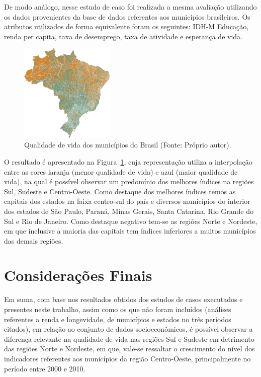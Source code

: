 \documentclass[conference]{IEEEtran}
\begin{document}
De modo análogo, nesse estudo de caso foi realizada a mesma avaliação utilizando os dados provenientes da base de dados referentes aos municípios brasileiros. Os atributos utilizados de forma equivalente foram os seguintes: IDH-M Educação, renda per capita, taxa de desemprego, taxa de atividade e esperança de vida. 

\begin{figure}[!ht]
\centering
\includegraphics[width=0.40\textwidth]{qualidade-de-vida.png}
\caption{Qualidade de vida dos municípios do Brasil (Fonte: Próprio autor).}
\label{img:qualidade-de-vida-brasil}
\end{figure}

O resultado é apresentado na Figura~\ref{img:qualidade-de-vida-brasil}, cuja representação utiliza a interpolação entre as cores laranja (menor qualidade de vida) e azul (maior qualidade de vida), na qual é possível observar um predomínio dos melhores índices na regiões Sul, Sudeste e Centro-Oeste. Como destaque dos melhores índices temos as capitais dos estados na faixa centro-sul do país e diversos municípios do interior dos estados de São Paulo, Paraná, Minas Gerais, Santa Catarina, Rio Grande do Sul e Rio de Janeiro. Como destaque negativo tem-se as regiões Norte e Nordeste, em que inclusive a maioria das capitais tem índices inferiores a muitos municípios das demais regiões.

\section{Considerações Finais}
\label{section:conclusao}
Em suma, com base nos resultados obtidos dos estudos de casos executados e presentes neste trabalho, assim como os que não foram incluídos (análises referentes a renda e longevidade, de municípios e estados no três períodos citados), em relação ao conjunto de dados socioeconômicos, é possível observar a diferença relevante na qualidade de vida nas regiões Sul e Sudeste em detrimento das regiões Norte e Nordeste, em que, vale-se ressaltar o crescimento do nível dos indicadores referentes aos municípios da região Centro-Oeste, principalmente no período entre 2000 e 2010.
\end{document}
